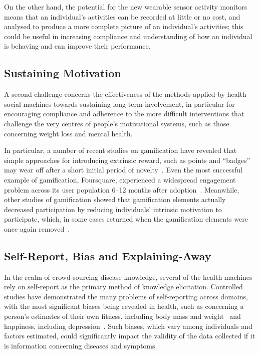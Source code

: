 \documentclass{www13-companion-accepted}
\begin{document}
On the other hand, the potential for the new wearable sensor activity
monitors means that an individual's activities can be recorded at
little or no cost, and analysed to produce a more complete picture of
an individual's activities; this could be useful in increasing
compliance and understanding of how an individual is behaving and can
improve their performance.

\subsection{Sustaining Motivation}
\label{sec:motivation}
A second challenge concerns the effectiveness of the methods applied by
health social machines towards sustaining long-term involvement, in
particular for encouraging compliance and adherence to the more
difficult interventions that challenge the very centres of people's
motivational systems, such as those concerning weight loss and
mental health.

In particular, a number of recent studies on gamification have
revealed that simple approaches for introducing extrinsic reward, such
as points and ``badges'' may wear off after a short initial period of
novelty~\cite{therebedragons}.  Even the most successful example of
gamification, Foursquare, experienced a widespread engagement problem
across its user population 6--12 months after adoption~\cite{browningattheedges}. Meanwhile, other studies of gamification
showed that gamification elements actually decreased participation by
reducing individuals' intrinsic motivation to participate, which, in
some cases returned when the gamification elements were once again
removed~\cite{Thom:2012:RGE:2145204.2145362}.

\subsection{Self-Report, Bias and Explaining-Away}

In the realm of crowd-sourcing disease knowledge, several of the
health machines rely on self-report as the primary method of knowledge
elicitation.  Controlled studies have demonstrated the many problems
of self-reporting across domains, with the most significant biases being
revealed in health, such as concerning a person's estimates of their
own fitness, including body mass and weight~\cite{elgar2005validity}
and happiness, including depression~\cite{hunt2003self}. Such biases,
which vary among individuals and factors estimated, could
significantly impact the validity of the data collected if it is
information concerning diseases and symptoms.
\end{document}
